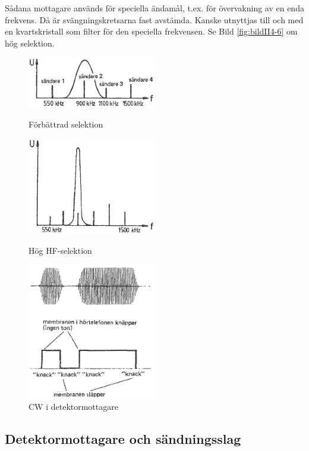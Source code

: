 Sådana mottagare används för speciella ändamål, t.ex. för övervakning
av en enda frekvens.
Då är svängningskretsarna fast avstämda.
Kanske utnyttjas till och med en kvartskristall som filter för den speciella
frekvensen.
Se Bild \ref{fig:bildII4-6} om hög selektion.

\begin{figure}
  \includegraphics[width=0.5\textwidth]{images/cropped_pdfs/bild_2_4-04.pdf}
  \caption{Förbättrad selektion}
  \label{fig:bildII4-4}

  \includegraphics[width=0.5\textwidth]{images/cropped_pdfs/bild_2_4-06.pdf}
  \caption{Hög HF-selektion}
  \label{fig:bildII4-6}

  \includegraphics[width=0.5\textwidth]{images/cropped_pdfs/bild_2_4-07.pdf}
  \caption{CW i detektormottagare}
  \label{fig:bildII4-7}
\end{figure}

\subsection{Detektormottagare och sändningsslag}


